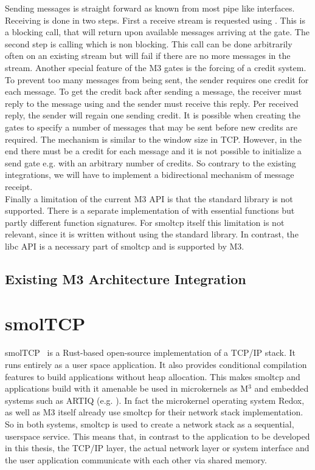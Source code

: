 Sending messages is straight forward as known from most pipe like interfaces. Receiving is done in two steps. First a receive stream is requested using . This is a blocking call, that will return upon available  messages arriving at the gate. The second step is calling  which is non blocking. This call can be done arbitrarily often on an existing stream but will fail if there are no more messages in the stream. Another special feature of the M3 gates is the forcing of a credit system. To prevent too many messages from being sent, the sender requires one credit for each message. To get the credit back after sending a message, the receiver must reply to the message using  and the sender must receive this reply. Per received reply, the sender will regain one sending credit. It is possible when creating the gates to specify a number of messages that may be sent before new credits are required. The mechanism is similar to the window size in TCP. However, in the end there must be a credit for each message and it is not possible to initialize a send gate e.g. with an arbitrary number of credits. So contrary to the existing integrations, we will have to implement a bidirectional mechanism of message receipt.\\

Finally a limitation of the current M3 API is that the standard library is not supported. There is a separate implementation of  with essential functions but partly different function signatures. For smoltcp itself this limitation is not relevant, since it is written without using the standard library. In contrast, the libc API is a necessary part of smoltcp and is supported by M3. 

\subsection{Existing M3 Architecture Integration}


\section{smolTCP}
smolTCP~\cite{smolTCP} is a Rust-based open-source implementation of a TCP/IP stack. It runs entirely as a user space application. It also provides conditional compilation features to build applications without heap allocation. This makes smoltcp and applications build with it amenable be used in microkernels as M$^3$\cite{Asmussen:M3v} and embedded systems such as ARTIQ (e.g. \cite{lam2021combining}). In fact the microkernel operating system Redox\cite{redoxwebsite}, as well as M3 itself already use smoltcp for their network stack implementation. So in both systems, smoltcp is used to create a network stack as a sequential, userspace service. This means that, in contrast to the application to be developed in this thesis, the TCP/IP layer, the actual network layer or system interface and the user application communicate with each other via shared memory. \\

